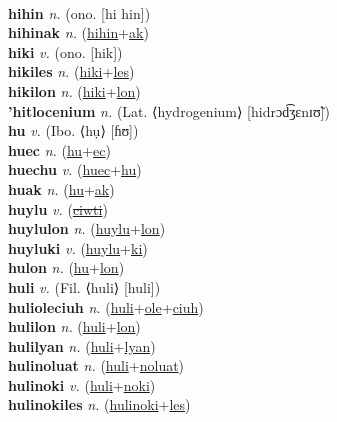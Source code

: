  \label{hihacwelonkoki} \\
\textbf{hihin} \textit{n.} (ono. [hi hin])
 \label{hihin} \\
\textbf{hihinak} \textit{n.} (\hyperref[hihin]{hihin}+\hyperref[ak]{ak})
 \label{hihinak} \\
\textbf{hiki} \textit{v.} (ono. [hik])
 \label{hiki} \\
\textbf{hikiles} \textit{n.} (\hyperref[hiki]{hiki}+\hyperref[les]{les})
 \label{hikiles} \\
\textbf{hikilon} \textit{n.} (\hyperref[hiki]{hiki}+\hyperref[lon]{lon})
 \label{hikilon} \\
\textbf{'hitlocenium} \textit{n.} (Lat. ⟨hydrogenium⟩ [hidrɔd͡ʒɛnɪʊ̃])
 \label{'hitlocenium} \\
\textbf{hu} \textit{v.} (Ibo. ⟨hụ⟩ [ɦʊ])
 \label{hu} \\
\textbf{huec} \textit{n.} (\hyperref[hu]{hu}+\hyperref[ec]{ec})
 \label{huec} \\
\textbf{huechu} \textit{v.} (\hyperref[huec]{huec}+\hyperref[hu]{hu})
 \label{huechu} \\
\textbf{huak} \textit{n.} (\hyperref[hu]{hu}+\hyperref[ak]{ak})
 \label{huak} \\
\textbf{huylu} \textit{v.} (\hyperref[ciwti]{\sout{ciwti}})
 \label{huylu} \\
\textbf{huylulon} \textit{n.} (\hyperref[huylu]{huylu}+\hyperref[lon]{lon})
 \label{huylulon} \\
\textbf{huyluki} \textit{v.} (\hyperref[huylu]{huylu}+\hyperref[ki]{ki})
 \label{huyluki} \\
\textbf{hulon} \textit{n.} (\hyperref[hu]{hu}+\hyperref[lon]{lon})
 \label{hulon} \\
\textbf{huli} \textit{v.} (Fil. ⟨huli⟩ [huli])
 \label{huli} \\
\textbf{hulioleciuh} \textit{n.} (\hyperref[huli]{huli}+\hyperref[ole]{ole}+\hyperref[ciuh]{ciuh})
 \label{hulioleciuh} \\
\textbf{hulilon} \textit{n.} (\hyperref[huli]{huli}+\hyperref[lon]{lon})
 \label{hulilon} \\
\textbf{hulilyan} \textit{n.} (\hyperref[huli]{huli}+\hyperref[lyan]{lyan})
 \label{hulilyan} \\
\textbf{hulinoluat} \textit{n.} (\hyperref[huli]{huli}+\hyperref[noluat]{noluat})
 \label{hulinoluat} \\
\textbf{hulinoki} \textit{v.} (\hyperref[huli]{huli}+\hyperref[noki]{noki})
 \label{hulinoki} \\
\textbf{hulinokiles} \textit{n.} (\hyperref[hulinoki]{hulinoki}+\hyperref[les]{les})
